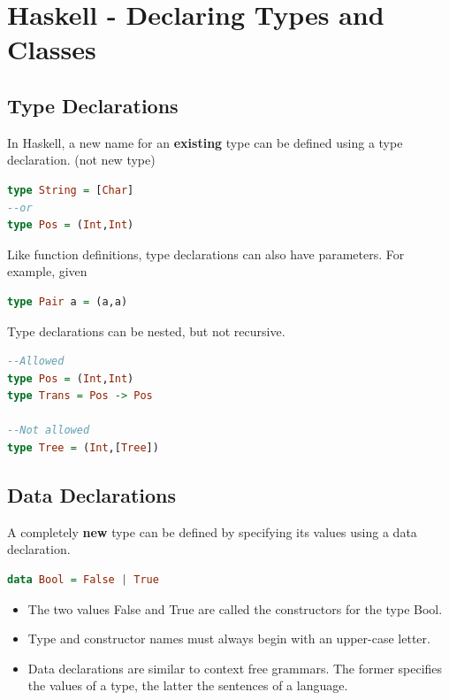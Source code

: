 \hypertarget{haskell}{%
\section{Haskell - Declaring Types and Classes}\label{haskell}}

\hypertarget{type-declarations}{%
\subsection{Type Declarations}\label{type-declarations}}

In Haskell, a new name for an \textbf{existing} type can be defined
using a type declaration. (not new type)

\begin{lstlisting}[language=Haskell]
type String = [Char]
--or
type Pos = (Int,Int)
\end{lstlisting}

Like function definitions, type declarations can also have parameters.
For example, given

\begin{lstlisting}[language=Haskell]
type Pair a = (a,a)
\end{lstlisting}

Type declarations can be nested, but not recursive.

\begin{lstlisting}[language=Haskell]
--Allowed
type Pos = (Int,Int)
type Trans = Pos -> Pos

--Not allowed
type Tree = (Int,[Tree])
\end{lstlisting}

\hypertarget{data-declarations}{%
\subsection{Data Declarations}\label{data-declarations}}

A completely \textbf{new} type can be defined by specifying its values
using a data declaration.

\begin{lstlisting}[language=Haskell]
data Bool = False | True
\end{lstlisting}

\begin{itemize}
\tightlist
\item
  The two values False and True are called the constructors for the type
  Bool.
\item
  Type and constructor names must always begin with an upper-case
  letter.
\item
  Data declarations are similar to context free grammars. The former
  specifies the values of a type, the latter the sentences of a
  language.
\end{itemize}

